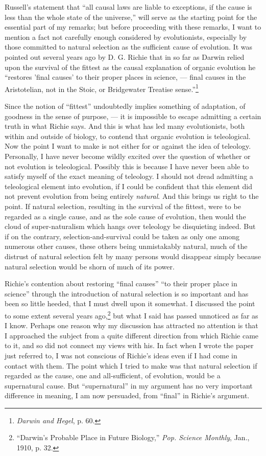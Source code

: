 \documentclass[a4paper, 11pt, oneside, polutonikogreek, english]{article}
\begin{document}
Russell's statement that ``all causal laws are liable to exceptions, if the cause is less than the whole state of the universe,'' will serve as the starting point for the essential part of my remarks; but before proceeding with these remarks, I want to mention a fact not carefully enough considered by evolutionists, especially by those committed to natural selection as the sufficient cause of evolution. It was pointed out several years ago by D. G. Richie that in so far as Darwin relied upon the survival of the fittest as the causal explanation of organic evolution he ``restores 'final causes' to their proper places in science, --- final causes in the Aristotelian, not in the Stoic, or Bridgewater Treatise sense.''\footnote{\emph{Darwin and Hegel}, p. 60.}

Since the notion of ``fittest'' undoubtedly implies something of adaptation, of goodness in the sense of purpose, --- it is impossible to escape admitting a certain truth in what Richie says. And this is what has led many evolutionists, both within and outside of biology, to contend that organic evolution is teleological. Now the point I want to make is not either for or against the idea of teleology. Personally, I have never become wildly excited over the question of whether or not evolution is teleological. Possibly this is because I have never been able to satisfy myself of the exact meaning of teleology. I should not dread admitting a teleological element into evolution, if I could be confident that this element did not prevent evolution from being entirely \emph{natural}. And this brings us right to the point. If natural selection, resulting in the survival of the fittest, were to be regarded as a single cause, and as the sole cause of evolution, then would the cloud of super-naturalism which hangs over teleology be disquieting indeed. But if on the contrary, selection-and-survival could be taken as only one among numerous other causes, these others being unmistakably natural, much of the distrust of natural selection felt by many persons would disappear simply because natural selection would be shorn of much of its power.

Richie's contention about restoring ``final causes'' ``to their proper place in science'' through the introduction of natural selection is so important and has been so little heeded, that I must dwell upon it somewhat. I discussed the point to some extent several years ago,\footnote{``Darwin's Probable Place in Future Biology,'' \emph{Pop. Science Monthly}, Jan., 1910, p. 32.} but what I said has passed unnoticed as far as I know. Perhaps one reason why my discussion has attracted no attention is that I approached the subject from a quite different direction from which Richie came to it, and so did not connect my views with his. In fact when I wrote the paper just referred to, I was not conscious of Richie's ideas even if I had come in contact with them. The point which I tried to make was that natural selection if regarded as the cause, one and all-sufficient, of evolution, would be a supernatural cause. But ``supernatural'' in my argument has no very important difference in meaning, I am now persuaded, from ``final'' in Richie's argument.
\end{document}
